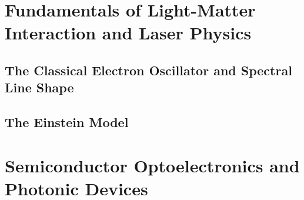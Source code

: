\documentclass[12pt,oneside,openany]{book}
\begin{document}
\newpage
{
    \hypersetup{linkcolor=black}
    \tableofcontents
}

\part{Fundamentals of Light-Matter Interaction and Laser Physics}

\chapter{The Classical Electron Oscillator and Spectral Line Shape}


\chapter{The Einstein Model}


% 

% 

\part{Semiconductor Optoelectronics and Photonic Devices}

% 

% 

% 

% 

% 

% 
\end{document}

